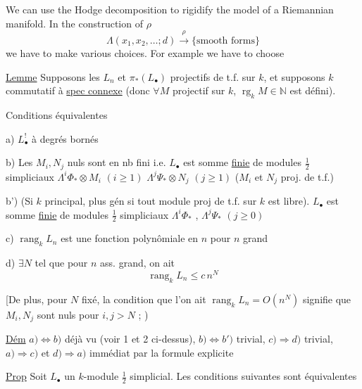 We can use the Hodge decomposition to rigidify the model of a Riemannian manifold. In the construction of $\rho$
\[
\Lambda(x_1,x_2,\ldots;d)\xrightarrow{\rho}\{\text{smooth forms}\}
\]
we have to make various choices. For example we have to choose

\uline{Lemme} Supposons les $L_n$ et $\pi_*(L_{\bullet})$ projectifs de t.f. sur $k$, et supposons $k$ commutatif à \uline{spec connexe} (donc $\forall M$ projectif sur $k$, $\operatorname{rg}_k M\in\mathbb N$ est défini).

Conditions équivalentes

a) $L_{\bullet}^{!}$ à degrés bornés

b)  Les $M_i,N_j$  nuls sont en nb fini i.e. $L_{\bullet}$ est \inserted{$\simeq$} somme \uline{finie} de modules $\frac12$ simpliciaux $\Lambda^i\Phi_*\otimes M_i$ $(i\geq1)$ $\Lambda^j\Psi_*\otimes N_j$ $(j\geq1)$ ($M_i$ et $N_j$ proj. de t.f.)

b') (Si $k$ principal, plus gén si tout module proj de t.f. sur $k$ est libre). $L_{\bullet}$ est \inserted{$\simeq$} somme \uline{finie} de modules $\frac12$ simpliciaux $\Lambda^i\Phi_*$ , $\Lambda^j\Psi_*$ $(j\geq0)$

c) $\operatorname{rang}_k L_n$ est une fonction polynômiale en $n$ pour $n$ grand

d) $\exists N$  tel que pour $n$ ass. grand, on ait
\[
\operatorname{rang}_k L_n\leq c\,n^N
\]

 [De plus,  pour $N$ fixé, la condition que l'on ait $\operatorname{rang}_k L_n=O(n^N)$ signifie que $M_i,N_j$ sont nuls pour $i,j>N$ ; )

\uline{Dém}  $a)\Longleftrightarrow b)$ déjà vu (voir 1 et 2 ci-dessus), $b)\Longleftrightarrow b')$ trivial,  $c)\Longrightarrow d)$ trivial, $a)\Longrightarrow c)$ et $d)\Longrightarrow a)$ immédiat par la formule explicite

\uline{Prop} Soit $L_{\bullet}$ un $k$-module $\frac12$ simplicial. Les conditions suivantes sont équivalentes

